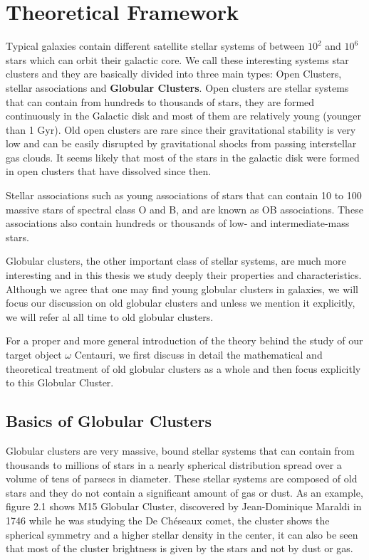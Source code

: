 \chapter{Theoretical Framework}

Typical galaxies contain different satellite stellar systems of between $ 10^{2} $ and $ 10^{6} $ stars which can orbit their galactic core. We call these interesting systems star clusters and they are basically divided into three main types: Open Clusters, stellar associations and \textbf{Globular Clusters}. Open clusters are stellar systems that can contain from hundreds to thousands of stars, they are formed continuously in the Galactic disk and most of them are relatively young (younger than 1 Gyr). Old open clusters are rare since their gravitational stability is very low and can be easily disrupted by gravitational shocks from passing interstellar gas clouds. It seems likely that most of the stars in the galactic disk were formed in open clusters that have dissolved since then. 

Stellar associations such as young associations of stars that can contain 10 to 100 massive stars of spectral class O and B, and are known as OB associations. These associations also contain hundreds or thousands of low- and intermediate-mass stars.

Globular clusters, the other important class of stellar systems, are much more interesting and in this thesis we study deeply their properties and characteristics. Although we agree that one may find young globular clusters in galaxies, we will focus our discussion on old globular clusters and unless we mention it explicitly, we will refer al all time to old globular clusters. 

For a proper and more general introduction of the theory behind the study of our target object $\omega$ Centauri, we first discuss in detail the mathematical and theoretical treatment of old globular clusters as a whole and then focus explicitly to this Globular Cluster. 

\section{Basics of Globular Clusters}
 
Globular clusters are very massive, bound stellar systems that can contain from thousands to millions of stars in a nearly spherical distribution spread over a volume of tens of parsecs in diameter. These stellar systems are composed of old stars and they do not contain a significant amount of gas or dust. As an example, figure 2.1 shows M15 Globular Cluster, discovered by Jean-Dominique Maraldi in 1746 while he was studying the De Chéseaux comet, the cluster shows the spherical symmetry and a higher stellar density in the center, it can also be seen that most of the cluster brightness is given by the stars and not by dust or gas.

